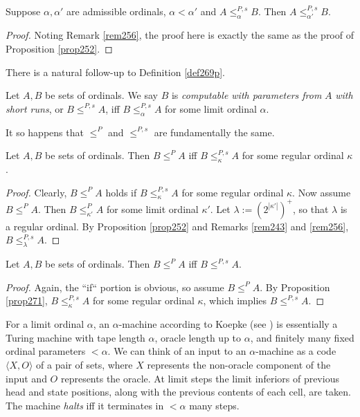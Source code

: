 \documentclass[12pt]{article}
\numberwithin{equation}{section}
\begin{document}
\begin{prop}\label{prop271n}
Suppose $\alpha, \alpha'$ are admissible ordinals, $\alpha < \alpha'$ and $A \leq^{P, s}_{\alpha} B$. Then $A \leq^{P, s}_{\alpha'} B$.
\end{prop}

\begin{proof}
Noting Remark \ref{rem256}, the proof here is exactly the same as the proof of Proposition \ref{prop252}.
\end{proof}

There is a natural follow-up to Definition \ref{def269p}.

\begin{defi}\label{def8329}
Let $A, B$ be sets of ordinals. We say $B$ is \emph{computable with parameters from} $A$ \emph{with short runs}, or $B \leq^{P, s} A$, iff $B \leq^{P, s}_{\alpha} A$ for some limit ordinal $\alpha$.
\end{defi}

It so happens that $\leq^P$ and $\leq^{P, s}$ are fundamentally the same.

\begin{prop}\label{prop271}
Let $A, B$ be sets of ordinals. Then $B \leq^P A$ iff $B \leq^{P, s}_{\kappa} A$ for some regular ordinal $\kappa$.
\end{prop}

\begin{proof}
Clearly, $B \leq^P A$ holds if $B \leq^{P, s}_{\kappa} A$ for some regular ordinal $\kappa$. Now assume $B \leq^P A$. Then $B \leq^P_{\kappa'} A$ for some limit ordinal $\kappa'$. Let $\lambda := (2^{|\kappa'|})^+$, so that $\lambda$ is a regular ordinal. By Proposition \ref{prop252} and Remarks \ref{rem243} and \ref{rem256}, $B \leq^{P, s}_{\lambda} A$.
\end{proof}

\begin{prop}
Let $A, B$ be sets of ordinals. Then $B \leq^P A$ iff $B \leq^{P, s} A$.
\end{prop}

\begin{proof}
Again, the ``if`` portion is obvious, so assume $B \leq^P A$. By Proposition \ref{prop271}, $B \leq^{P, s}_{\kappa} A$ for some regular ordinal $\kappa$, which implies $B \leq^{P, s} A$.
\end{proof}

For a limit ordinal $\alpha$, an $\alpha$-machine according to Koepke (see \cite{koepke2}) is essentially a Turing machine with tape length $\alpha$, oracle length up to $\alpha$, and finitely many fixed ordinal parameters $< \alpha$. We can think of an input to an $\alpha$-machine as a code $\langle X, O \rangle$ of a pair of sets, where $X$ represents the non-oracle component of the input and $O$ represents the oracle. At limit steps the limit inferiors of previous head and state positions, along with the previous contents of each cell, are taken. The machine \emph{halts} iff it terminates in $< \alpha$ many steps.
\end{document}
